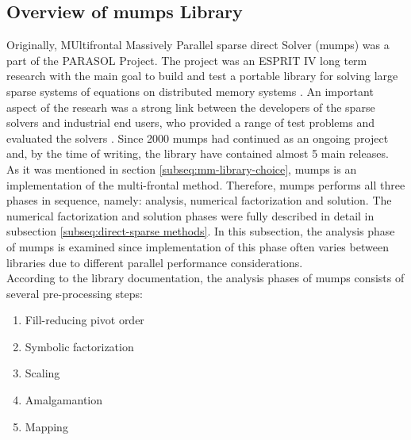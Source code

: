 \subsection{Overview of \gls{mumps} Library}
\label{subseq:mumps-review}

Originally, MUltifrontal Massively Parallel sparse direct Solver (\gls{mumps}) was a part of the PARASOL Project. The project was an ESPRIT IV long term research with the main goal to build and test a portable library for solving large sparse systems of equations on distributed memory systems \cite{PARASOL}. An important aspect of the researh was a strong link between the developers of the sparse solvers and industrial end users, who provided a range of test problems and evaluated the solvers \cite{MUMPS:description}. Since 2000 \gls{mumps} had continued as an ongoing project and, by the time of writing, the library have contained almost 5 main releases.\\



As it was mentioned in section \ref{subseq:mm-library-choice}, \gls{mumps} is an implementation of the multi-frontal method. Therefore, \gls{mumps} performs all three phases in sequence, namely: analysis, numerical factorization and solution. The numerical factorization and solution phases were fully described in detail in subsection \ref{subseq:direct-sparse methods}. In this subsection, the analysis phase of \gls{mumps} is examined since implementation of this phase often varies between libraries due to different parallel performance considerations.\\


According to the library documentation, the analysis phases of \gls{mumps} consists of several pre-processing steps:

\begin{enumerate}
  \item Fill-reducing pivot order \label{mumps:analysis-steps:1}
  \item Symbolic factorization \label{mumps:analysis-steps:2}
  \item Scaling \label{mumps:analysis-steps:3}
  \item Amalgamantion \label{mumps:analysis-steps:4}
  \item Mapping \label{mumps:analysis-steps:5}
\end{enumerate}


